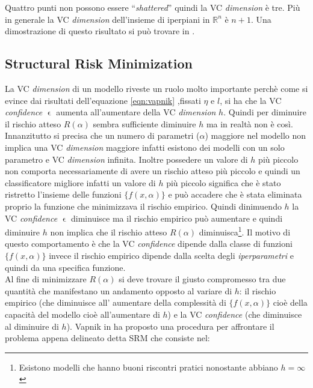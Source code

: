 Quattro punti non possono essere ``\textit{shattered}'' quindi la \ac{VC} \textit{dimension} è tre. Più in generale la \ac{VC} \textit{dimension} dell'insieme di iperpiani in $\mathbb{R}^{n}$ è $n+1$. Una dimostrazione di questo risultato si può trovare in \cite[p. 37]{Burges98}. 

\subsection{Structural Risk Minimization}
\label{sub:srm}
La \ac{VC} \textit{dimension} di un modello riveste un ruolo molto importante perchè come si evince dai risultati dell'equazione  \eqref{eqn:vapnik}  ,fissati $\eta \text{ e } l$, si ha che la \ac{VC} \textit{confidence} $\upvarepsilon$ aumenta all'aumentare della \ac{VC} \textit{dimension} $h$. Quindi per diminuire il rischio atteso $R(\alpha)$ sembra sufficiente diminuire $h$ ma in realtà non è così. 
Innanzitutto si precisa che un numero di parametri ($\alpha$) maggiore nel modello non implica  una \ac{VC} \textit{dimension} maggiore infatti esistono dei modelli con un solo parametro e \ac{VC} \textit{dimension} infinita. Inoltre possedere un valore di $h$ più piccolo non comporta necessariamente di avere un rischio atteso più piccolo e quindi un classificatore migliore infatti un valore di $h$ più piccolo significa che è stato ristretto l'insieme delle funzioni $\{f(x,\alpha)\}$ e può accadere che è stata eliminata proprio la funzione che minimizzava il rischio empirico. Quindi dinimuendo $h$ la \ac{VC} \textit{confidence} $\upvarepsilon$ diminuisce ma il rischio empirico può aumentare e quindi diminuire $h$ non implica che il rischio atteso $R(\alpha)$ diminuisca\footnote{Esistono modelli che hanno buoni riscontri pratici nonostante abbiano $h = \infty$}. Il motivo di questo comportamento è che la \ac{VC} \textit{confidence} dipende dalla classe di funzioni $\{f(x,\alpha)\}$ invece il rischio empirico dipende dalla scelta degli \textit{iperparametri} e quindi da una specifica funzione. \\ Al fine di minimizzare $R(\alpha)$ si deve trovare il giusto compromesso tra due quantità che manifestano un andamento opposto al variare di $h$: il rischio empirico (che diminuisce all' aumentare della complessità di  $\{f(x,\alpha)\}$ cioè della capacità del modello cioè all'aumentare di $h$) e la \ac{VC} \textit{confidence} (che diminuisce al diminuire di $h$). Vapnik in \cite{Vapnik82} ha proposto una procedura per affrontare il problema appena delineato detta \ac{SRM} che consiste nel:
